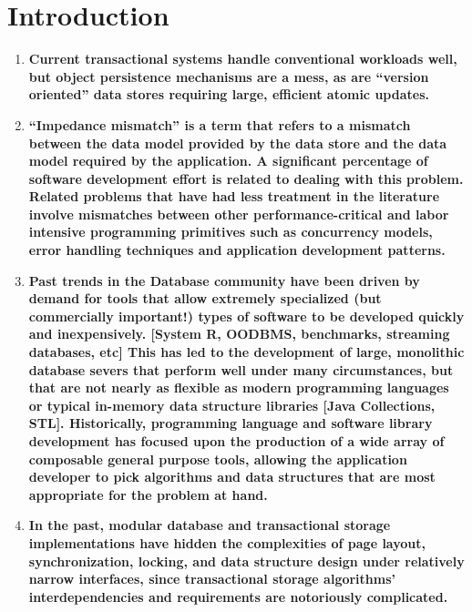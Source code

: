 \documentclass[letterpaper,english]{article}
\begin{document}
\section{Introduction}

\begin{enumerate}


  \item {\bf Current transactional systems handle conventional workloads
  well, but object persistence mechanisms are a mess, as are
  {}``version oriented'' data stores requiring large, efficient atomic
  updates.}

  \item {\bf {}``Impedance mismatch'' is a term that refers to a mismatch
  between the data model provided by the data store and the data model
  required by the application. A significant percentage of software
  development effort is related to dealing with this problem. Related
  problems that have had less treatment in the literature involve
  mismatches between other performance-critical and labor intensive
  programming primitives such as concurrency models, error handling
  techniques and application development patterns.}
  \item {\bf Past trends in the Database community have been driven by
  demand for tools that allow extremely specialized (but commercially
  important!)  types of software to be developed quickly and
  inexpensively. {[}System R, OODBMS, benchmarks, streaming databases,
  etc{]} This has led to the development of large, monolithic database
  severs that perform well under many circumstances, but that are not
  nearly as flexible as modern programming languages or typical
  in-memory data structure libraries {[}Java Collections,
  STL{]}. Historically, programming language and software library
  development has focused upon the production of a wide array of
  composable general purpose tools, allowing the application developer
  to pick algorithms and data structures that are most appropriate for
  the problem at hand.}

  \item {\bf In the past, modular database and transactional storage
  implementations have hidden the complexities of page layout,
  synchronization, locking, and data structure design under relatively
  narrow interfaces, since transactional storage algorithms'
  interdependencies and requirements are notoriously complicated.}


\end{enumerate}
\end{document}
